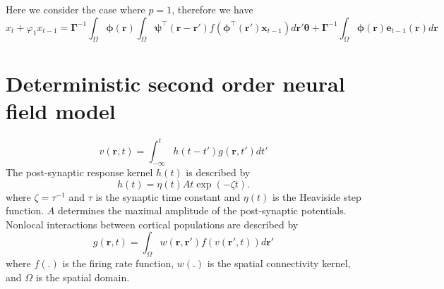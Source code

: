 \documentclass[a4paper,10pt]{article}
\begin{document}
Here we consider the case where $p=1$, therefore we have
\begin{equation}
x_t+\varphi_{1} x_{t-1}=\boldsymbol\Gamma^{-1}\int_{\Omega}\boldsymbol \phi(\mathbf r)\int_{\Omega}\boldsymbol{\psi}^\top\left(\mathbf{r}-\mathbf{r}'\right) f(\boldsymbol{\phi}^{\top}\left(\mathbf{r'}\right) \mathbf{x}_{t-1})d\mathbf r'\boldsymbol{\theta}+\boldsymbol\Gamma^{-1}\int_{\Omega}\boldsymbol\phi(\mathbf r)\mathbf e_{t-1}(\mathbf r)d\mathbf r
\end{equation}
\section{Deterministic second order neural field model}
\begin{equation}\label{SpikesToPotential}
	v\left( {\mathbf{r},t} \right) = \int_{ - \infty }^t {h\left( {t - t'} \right)g\left( {\mathbf{r},t'} \right)dt'}
\end{equation}
The post-synaptic response kernel $h(t)$ is described by
\begin{equation}\label{SynapticRespKernel}
	h(t) = \eta(t)At\exp{\left(-\zeta t\right)}.
\end{equation}
where $\zeta=\tau^{-1}$ and $\tau$ is the synaptic time constant and $\eta(t)$ is the Heaviside step function. $A$ determines the maximal amplitude of the post-synaptic potentials.
Nonlocal interactions between cortical populations are described by	
\begin{equation}\label{RateBasedInteractions}
	g\left( \mathbf{r},t \right) = \int_\Omega  {w\left( \mathbf{r},\mathbf{r}' \right)f\left( v\left( \mathbf{r}',t \right) \right)d\mathbf{r}'} 
\end{equation}
where $f(.)$ is the firing rate function, $w(.)$ is the spatial connectivity kernel, and $\Omega$ is the spatial domain.
\end{document}
